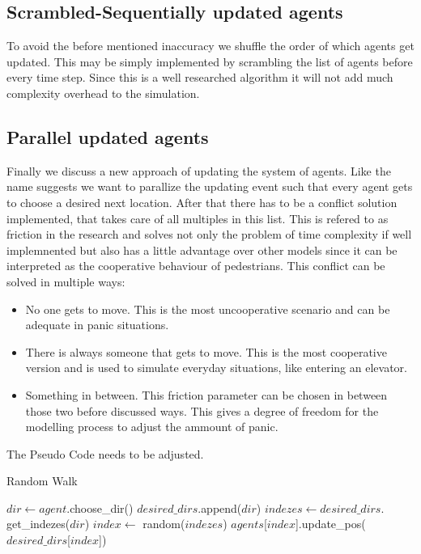 \subsection{Scrambled-Sequentially updated agents}
To avoid the before mentioned inaccuracy we shuffle the order of which agents get updated. 
This may be simply implemented by scrambling the list of agents before every time step.
Since this is a well researched algorithm it will not add much complexity overhead to the simulation. 

\subsection{Parallel updated agents}
Finally we discuss a new approach of updating the system of agents. Like the name suggests we want to parallize the 
updating event such that every agent gets to choose a desired next location. After that there has to be a conflict solution implemented, 
that takes care of all multiples in this list.
This is refered to as friction in the research and solves not only the problem of time complexity if well implemnented but 
also has a little advantage over other models since it can be interpreted as the cooperative behaviour of pedestrians. 
This conflict can be solved in multiple ways: 
\begin{itemize}
   \item No one gets to move. This is the most uncooperative scenario and can be adequate in panic situations.
   \item There is always someone that gets to move. This is the most cooperative version and is used to simulate everyday situations, 
   like entering an elevator.
   \item Something in between. This friction parameter can be chosen in between those two before discussed ways. 
   This gives a degree of freedom for the modelling process to adjust the ammount of panic. 
\end{itemize} 
The Pseudo Code needs to be adjusted. 

\begin{algorithm}
   \caption{Random Walk}\label{RW_friction}
   \begin{algorithmic}[1]
         \State $dir \gets agent.$choose\_dir()
         \State $desired\_dirs.$append($dir$)
               \State \Return
            \EndIf
               \State $indezes \gets $$desired\_dirs.$get\_indezes($dir$)
               \State $index \gets$  random($indezes$)
               \State $agents$[$index$].update\_pos($desired\_dirs$[$index$])
            \EndIf
         \EndFor
      \EndFor
   \EndFor
   \EndProcedure
   \end{algorithmic}
   \end{algorithm}


